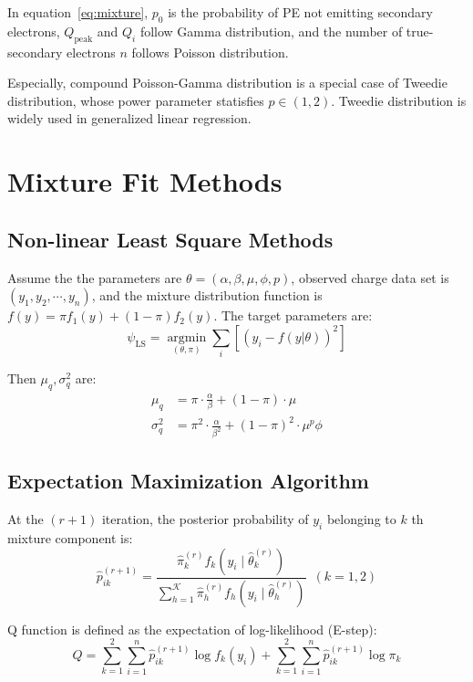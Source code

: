 \begin{survey}
In equation~\ref{eq:mixture}, $p_{0}$ is the probability of PE not emitting secondary electrons,
$Q_{\mathrm{peak}}$ and $Q_{i}$ follow Gamma distribution, 
and the number of true-secondary electrons $n$ follows Poisson distribution.

Especially, compound Poisson-Gamma distribution is a special case of Tweedie distribution,
whose power parameter statisfies $p\in(1, 2)$.
Tweedie distribution is widely used in generalized linear regression.

\section{Mixture Fit Methods}
\subsection{Non-linear Least Square Methods}
Assume the the parameters are $\theta=\left(\alpha, \beta, \mu, \phi, p\right)$, 
observed charge data set is $\left(y_{1},y_2,\cdots,y_n\right)$, 
and the mixture distribution function is $f(y)=\pi f_{1}(y)+(1-\pi)f_{2}(y)$. 
The target parameters are:
\begin{equation} 
    \psi_{\text{LS}}=\operatorname*{argmin}_{\left(\theta,\pi\right)} 
    \sum\limits_{i}\left[\left(y_i-f(y|\theta)\right)^{2}\right]
\end{equation}

Then $\mu_{q}, \sigma_{q}^{2}$ are:
\begin{equation}
    \begin{aligned}
    \mu_{q} & = \pi\cdot\frac{\alpha}{\beta}+(1-\pi)\cdot\mu\\
    \sigma_{q}^2 & = \pi^2\cdot\frac{\alpha}{\beta^2}+(1-\pi)^2\cdot\mu^p\phi
    \end{aligned}
\end{equation}

\subsection{Expectation Maximization Algorithm}
At the $(r+1)$ iteration, the posterior probability of $y_{i}$ belonging to $k$ th mixture component is:
\begin{equation}
    \hat{p}_{ik}^{(r+1)}=\frac{\hat{\pi}_k^{(r)}f_k(y_i\mid\hat{\theta}_k^{(r)})}
    {\sum_{h=1}^{\mathcal{K}}\hat{\pi}_h^{(r)}f_h(y_i\mid\hat{\theta}_h^{(r)})}\enspace(k=1,2)
\end{equation}

Q function is defined as the expectation of log-likelihood (E-step):
\begin{equation}
    Q=\sum_{k=1}^{2}\sum_{i=1}^{n}\hat{p}_{ik}^{(r+1)}\log f_{k}(y_{i})+\sum_{k=1}^{2}\sum_{i=1}^{n}\hat{p}_{ik}^{(r+1)}\log\pi_{k}
\end{equation}


\end{survey}
